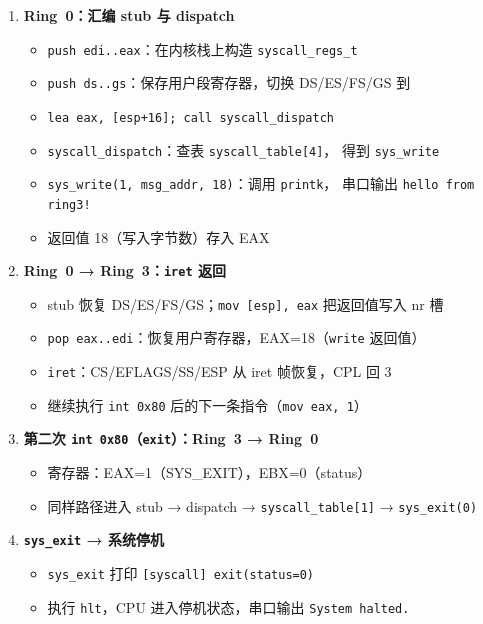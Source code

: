 \begin{enumerate}
  \item \textbf{Ring~0：汇编 stub 与 dispatch}
    \begin{itemize}
      \item \texttt{push edi..eax}：在内核栈上构造 \texttt{syscall\_regs\_t}
      \item \texttt{push ds..gs}：保存用户段寄存器，切换 DS/ES/FS/GS 到 
      \item \texttt{lea eax, [esp+16]; call syscall\_dispatch}
      \item \texttt{syscall\_dispatch}：查表 \texttt{syscall\_table[4]}，
        得到 \texttt{sys\_write}
      \item \texttt{sys\_write(1, msg\_addr, 18)}：调用 \texttt{printk}，
        串口输出 \texttt{hello from ring3!}
      \item 返回值 18（写入字节数）存入 EAX
    \end{itemize}

  \item \textbf{Ring~0 → Ring~3：\texttt{iret} 返回}
    \begin{itemize}
      \item stub 恢复 DS/ES/FS/GS；\texttt{mov [esp], eax} 把返回值写入 nr 槽
      \item \texttt{pop eax..edi}：恢复用户寄存器，EAX=18（\texttt{write} 返回值）
      \item \texttt{iret}：CS/EFLAGS/SS/ESP 从 iret 帧恢复，CPL 回 3
      \item 继续执行 \texttt{int 0x80} 后的下一条指令（\texttt{mov eax, 1}）
    \end{itemize}

  \item \textbf{第二次 \texttt{int 0x80}（\texttt{exit}）：Ring~3 → Ring~0}
    \begin{itemize}
      \item 寄存器：EAX=1（SYS\_EXIT），EBX=0（status）
      \item 同样路径进入 stub → dispatch → \texttt{syscall\_table[1]} →
        \texttt{sys\_exit(0)}
    \end{itemize}

  \item \textbf{\texttt{sys\_exit} → 系统停机}
    \begin{itemize}
      \item \texttt{sys\_exit} 打印 \texttt{[syscall] exit(status=0)}
      \item 执行 \texttt{hlt}，CPU 进入停机状态，串口输出 \texttt{System halted.}
    \end{itemize}
\end{enumerate}

